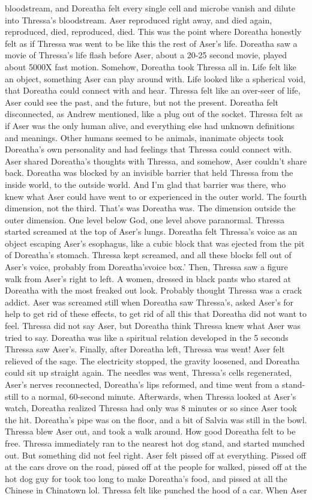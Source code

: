\documentclass[12pt]{book}
\begin{document}
bloodstream, and Doreatha felt every single cell and microbe vanish and dilute into Thressa's bloodstream. Aser reproduced right away, and died again, reproduced, died, reproduced, died. This was the point where Doreatha honestly felt as if Thressa was went to be like this the rest of Aser's life. Doreatha saw a movie of Thressa's life flash before Aser, about a 20-25 second movie, played about 5000X fast motion. Somehow, Doreatha took Thressa all in. Life felt like an object, something Aser can play around with. Life looked like a spherical void, that Doreatha could connect with and hear. Thressa felt like an over-seer of life, Aser could see the past, and the future, but not the present. Doreatha felt disconnected, as Andrew mentioned, like a plug out of the socket. Thressa felt as if Aser was the only human alive, and everything else had unknown definitions and meanings. Other humans seemed to be animals, inanimate objects took Doreatha's own personality and had feelings that Thressa could connect with. Aser shared Doreatha's thoughts with Thressa, and somehow, Aser couldn't share back. Doreatha was blocked by an invisible barrier that held Thressa from the inside world, to the outside world. And I'm glad that barrier was there, who knew what Aser could have went to or experienced in the outer world. The fourth dimension, not the third. That's was Doreatha was. The dimension outside the outer dimension. One level below God, one level above paranormal. Thressa started screamed at the top of Aser's lungs. Doreatha felt Thressa's voice as an object escaping Aser's esophagus, like a cubic block that was ejected from the pit of Doreatha's stomach. Thressa kept screamed, and all these blocks fell out of Aser's voice, probably from Doreatha'svoice box.' Then, Thressa saw a figure walk from Aser's right to left. A women, dressed in black pants who stared at Doreatha with the most freaked out look. Probably thought Thressa was a crack addict. Aser was screamed still when Doreatha saw Thressa's, asked Aser's for help to get rid of these effects, to get rid of all this that Doreatha did not want to feel. Thressa did not say Aser, but Doreatha think Thressa knew what Aser was tried to say. Doreatha was like a spiritual relation developed in the 5 seconds Thressa saw Aser's. Finally, after Doreatha left, Thressa was went! Aser felt relieved of the sage. The electricity stopped, the gravity loosened, and Doreatha could sit up straight again. The needles was went, Thressa's cells regenerated, Aser's nerves reconnected, Doreatha's lips reformed, and time went from a stand-still to a normal, 60-second minute. Afterwards, when Thressa looked at Aser's watch, Doreatha realized Thressa had only was 8 minutes or so since Aser took the hit. Doreatha's pipe was on the floor, and a bit of Salvia was still in the bowl. Thressa blew Aser out, and took a walk around. How good Doreatha felt to be free. Thressa immediately ran to the nearest hot dog stand, and started munched out. But something did not feel right. Aser felt pissed off at everything. Pissed off at the cars drove on the road, pissed off at the people for walked, pissed off at the hot dog guy for took too long to make Doreatha's food, and pissed at all the Chinese in Chinatown lol. Thressa felt like punched the hood of a car. When Aser 
\end{document}
